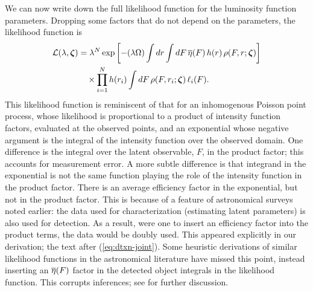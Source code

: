 We can now write down the full likelihood function for the luminosity function parameters.
Dropping some factors that do not depend on the parameters, the likelihood function is
\begin{equation}\label{eq:like}
\begin{split}
\mathcal{L}(\lambda, \boldsymbol{\zeta})
  &= \lambda^N \exp\left[- (\lambda \Omega) \int dr \int dF\,
            \overline{\eta}(F)\, h(r)\, \rho(F,r;\boldsymbol{\zeta})\right]\\
  &\quad\times \prod_{i=1}^N h(r_i) \int dF\, \rho(F,r_i;\boldsymbol{\zeta})\, \ell_i(F).
\end{split}
\end{equation}
This likelihood function is reminiscent of that for an inhomogenous Poisson point process, whose likelihood is proportional to a product of intensity function factors, evaluated at the observed points, and an exponential whose negative argument is the integral of the intensity function over the observed domain.
One difference is the integral over the latent observable, $F$, in the product factor; this accounts for measurement error.
A more subtle difference is that integrand in the exponential is not the same function playing the role of the intensity function in the product factor.
There is an average efficiency factor in the exponential, but not in the product factor.
This is because of a feature of astronomical surveys noted earlier: the data used for characterization (estimating latent parameters) is also used for detection.
As a result, were one to insert an efficiency factor into the product terms, the data would be doubly used.
This appeared explicitly in our derivation; the text after (\ref{eq:dtxn-joint}).
Some heuristic derivations of similar likelihood functions in the astronomical literature have missed this point, instead inserting an $\overline{\eta}(F)$ factor in the detected object integrals in the likelihood function.
This corrupts inferences; see \cite{L04-MsmtErr} for further discussion.

